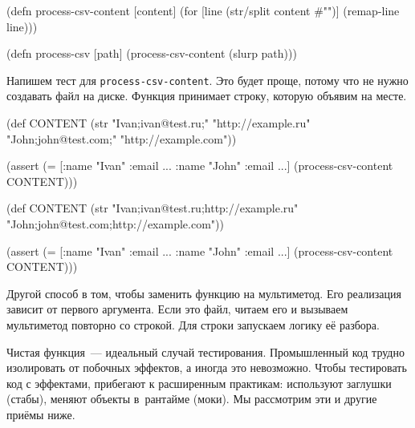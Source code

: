 \else

\begin{english}
  \begin{clojure}
(defn process-csv-content [content]
  (for [line (str/split content #"\n")]
    (remap-line line)))

(defn process-csv [path]
  (process-csv-content (slurp path)))
  \end{clojure}
\end{english}

\fi

Напишем тест для \verb|process-csv-content|. Это будет проще, потому что не
нужно создавать файл на диске. Функция принимает строку, которую объявим на
месте.

\ifnarrow

\begin{english}
  \begin{clojure}
(def CONTENT
  (str "Ivan;ivan@test.ru;"
       "http://example.ru"
       \newline
       "John;john@test.com;"
       "http://example.com"))

(assert
  (= [{:name "Ivan" :email ...}
      {:name "John" :email ...}]
     (process-csv-content CONTENT)))
  \end{clojure}
\end{english}

\else

\begin{english}
  \begin{clojure}
(def CONTENT
  (str "Ivan;ivan@test.ru;http://example.ru"
       \newline
       "John;john@test.com;http://example.com"))

(assert (= [{:name "Ivan" :email ...}
            {:name "John" :email ...}]
           (process-csv-content CONTENT)))
  \end{clojure}
\end{english}

\fi

Другой способ в том, чтобы заменить функцию на мультиметод. Его реализация
зависит от первого аргумента. Если это файл, читаем его и вызываем мультиметод
повторно со строкой. Для строки запускаем логику её разбора.

Чистая функция~--- идеальный случай тестирования. Промышленный код трудно
изолировать от побочных эффектов, а иногда это невозможно. Чтобы тестировать код
с эффектами, прибегают к расширенным практикам: используют заглушки (стабы),
меняют объекты в~рантайме (моки). Мы рассмотрим эти и другие приёмы ниже.

